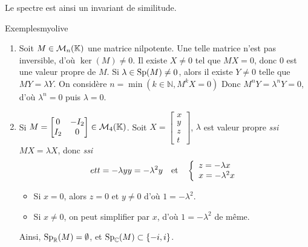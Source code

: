     Le spectre est ainsi un invariant de similitude.

    \begin{omed}{Exemples}{myolive}
        \begin{enumerate}[label=\arabic*.]
            \item Soit $M \in \mathcal{M}_{n}(\mathbb{K})$ une matrice nilpotente. Une telle matrice n’est pas inversible, d’où $\ker(M) \neq 0$. Il existe $X \neq 0$ tel que $M X = 0$, donc $0$ est une valeur propre de $M$. Si $\lambda \in \operatorname{Sp}(M) \neq 0$, alors il existe $Y \neq 0$ telle que $MY = \lambda Y$. On considère $n = \min(k \in \mathbb{N}, M^k X = 0)$ Donc $M^n Y = \lambda^n Y = 0$, d’où $\lambda^n = 0$ puis $\lambda = 0$.
            \item Si $M = \begin{bmatrix}
                0 & -I_2 \\
                I_2 & 0
            \end{bmatrix} \in \mathcal{M}_{4}(\mathbb{K})$. Soit $X = \begin{bmatrix}
                x \\
                y \\
                z \\
                t
            \end{bmatrix}$, $\lambda$ est valeur propre \textit{ssi} $MX = \lambda X$, donc \textit{ssi} 
            \[et{t = -\lambda y}{y = -\lambda^2 y} \esp{et} \et{z = -\lambda x}{x = - \lambda^2 x}\]
            \begin{itemize}
                \item Si $x = 0$, alors $z = 0$ et $y \neq 0$ d’où $1 = - \lambda^2$.
                \item Si $x \neq 0$, on peut simplifier par $x$, d’où $1 = - \lambda^2$ de même.
            \end{itemize}
            Ainsi, $\operatorname{Sp}_{\mathbb{R}}(M) = \emptyset$, et $\operatorname{Sp}_{\mathbb{C}}(M) \subset \left\{-i, i\right\}$.
\end{enumerate}
\end{omed}
